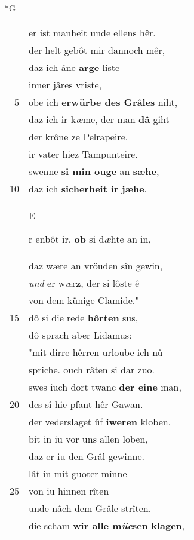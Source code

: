 \documentclass[8pt,a4paper,notitlepage]{article}
\begin{document}
\begin{table}[ht]
\begin{minipage}[t]{0.5\linewidth}
\small
\begin{center}*G
\end{center}
\begin{tabular}{rl}
 & er ist manheit unde ellens hêr.\\ 
 & der helt gebôt mir dannoch mêr,\\ 
 & daz ich âne \textbf{arge} liste\\ 
 & inner jâres vriste,\\ 
5 & obe ich \textbf{erwürbe des Grâles} niht,\\ 
 & daz ich ir k\textit{œ}me, der man \textbf{dâ} giht\\ 
 & der krône ze Pelrapeire.\\ 
 & ir vater hiez Tampunteire.\\ 
 & swenne \textbf{si mîn ouge} an \textbf{sæhe},\\ 
10 & daz ich \textbf{sicherheit ir} \textbf{jæhe}.\\ 
 & \begin{large}E\end{large}r enbôt ir, \textbf{ob} si d\textit{æ}hte an in,\\ 
 & daz wære an vröuden sîn gewin,\\ 
 & \textit{und} er w\textit{æ}r\textbf{z}, der si lôste ê\\ 
 & von dem künige Clamide."\\ 
15 & dô si die rede \textbf{hôrten} sus,\\ 
 & dô sprach aber Lidamus:\\ 
 & "mit dirre hêrren urloube ich nû\\ 
 & spriche. ouch râten si dar zuo.\\ 
 & swes iuch dort twanc \textbf{der eine} man,\\ 
20 & des sî hie pfant hêr Gawan.\\ 
 & der vederslaget ûf \textbf{iweren} kloben.\\ 
 & bit in iu vor uns allen loben,\\ 
 & daz er iu den Grâl gewinne.\\ 
 & lât in mit guoter minne\\ 
25 & von iu hinnen rîten\\ 
 & unde nâch dem Grâle strîten.\\ 
 & die scham \textbf{wir alle m\textit{üe}sen} \textbf{klagen},\\ 

\end{tabular}
\end{minipage}
\end{table}
\end{document}

